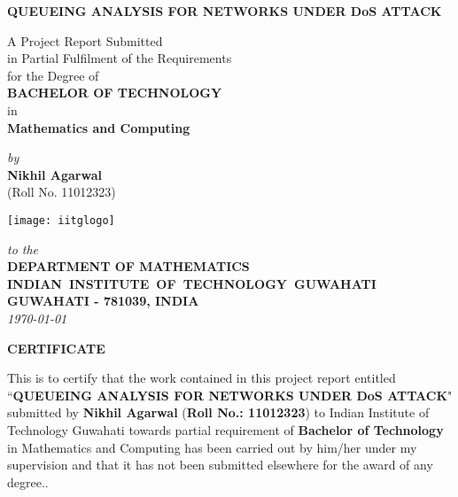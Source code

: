 \documentclass[12pt,a4paper]{report}
\theoremstyle{plain}
\theoremstyle{definition}
\theoremstyle{remark}
\begin{document}


\begin{titlepage}
\enlargethispage{3cm}

\begin{center}

\vspace*{-2cm}

\textbf{\Large QUEUEING ANALYSIS FOR NETWORKS UNDER DoS ATTACK}

\vfill

 A Project Report Submitted \\
 in Partial Fulfilment of the Requirements  \\
  for the Degree of  \\[10pt]

 {\Large \bf BACHELOR OF TECHNOLOGY}\\[5pt]
 in \\
 {\large \bf Mathematics and Computing}

 \vfill

{\large \emph{by}}\\[5pt]
{\large\bf {Nikhil Agarwal}}\\[5pt]
{\large (Roll No. 11012323)}

\vfill
\texttt{[image: iitglogo]}

\vspace*{0.5cm}

{\em\large to the}\\[10pt]
{\bf\large DEPARTMENT OF MATHEMATICS} \\[5pt]
{\bf\large \mbox{INDIAN INSTITUTE OF TECHNOLOGY GUWAHATI}}\\[5pt]
{\bf\large GUWAHATI - 781039, INDIA}\\[10pt]
{\it\large \today}
\end{center}

\end{titlepage}

\clearpage


 \setcounter{page}{2}
\begin{center}
{\Large{\bf{CERTIFICATE}}}
\end{center}


\noindent
\hspace{1.5 cm}This is to certify that the work contained in this project report
entitled \\
 ``{\bf QUEUEING ANALYSIS FOR NETWORKS UNDER DoS ATTACK}" submitted by {\bf Nikhil Agarwal} ({\bf Roll No.: 11012323}) to Indian Institute of Technology Guwahati
towards partial requirement of {\bf Bachelor of Technology} in Mathematics and Computing  has been carried out
by him/her under my supervision and that it has not been submitted elsewhere
for the award of any degree..
\end{document}
